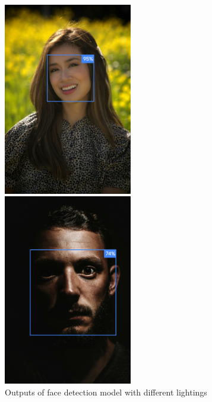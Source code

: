 \begin{figure}[ht]
	\centering
	\begin{minipage}{0.5\textwidth}
		\centering
		\includegraphics[width=0.5\textwidth]{images/face_detection_good.png}
	\end{minipage}%
	\begin{minipage}{0.5\textwidth}
		\centering
		\includegraphics[width=0.5\textwidth]{images/face_detection.png}
	\end{minipage}
	\caption{Outputs of face detection model with different lightings}
	\label{fig:face_detections} %
\end{figure}



